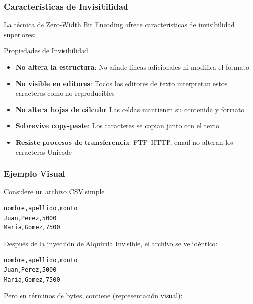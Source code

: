 \subsubsection{Características de Invisibilidad}

La técnica de Zero-Width Bit Encoding ofrece características de invisibilidad superiores:

\begin{caja}{Propiedades de Invisibilidad}
\begin{itemize}
\item \textbf{No altera la estructura}: No añade líneas adicionales ni modifica el formato
\item \textbf{No visible en editores}: Todos los editores de texto interpretan estos caracteres como no reproducibles
\item \textbf{No altera hojas de cálculo}: Las celdas mantienen su contenido y formato
\item \textbf{Sobrevive copy-paste}: Los caracteres se copian junto con el texto
\item \textbf{Resiste procesos de transferencia}: FTP, HTTP, email no alteran los caracteres Unicode
\end{itemize}
\end{caja}


\subsubsection{Ejemplo Visual}

Considere un archivo CSV simple:

\begin{verbatim}
nombre,apellido,monto
Juan,Perez,5000
Maria,Gomez,7500
\end{verbatim}

Después de la inyección de Alquimia Invisible, el archivo se ve idéntico:

\begin{verbatim}
nombre,apellido,monto
Juan,Perez,5000
Maria,Gomez,7500
\end{verbatim}

Pero en términos de bytes, contiene (representación visual):

